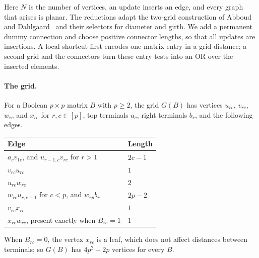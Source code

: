 Here $N$ is the number of vertices, an update inserts an edge, and every graph that arises is planar. The reductions adapt the two-grid construction of Abboud and Dahlgaard~\cite[Definition~1, Corollary~1, and Sections~3 and~6]{abboud_popular_2016} and their selectors for diameter and girth. We add a permanent dummy connection and choose positive connector lengths, so that all updates are insertions. A local shortcut first encodes one matrix entry in a grid distance; a second grid and the connectors turn these entry tests into an OR over the inserted elements.

\paragraph{The grid.}
For a Boolean $p\times p$ matrix $B$ with $p\ge2$, the grid $G(B)$ has vertices $u_{rc}$, $v_{rc}$, $w_{rc}$ and $x_{rc}$ for $r,c\in[p]$, top terminals $a_c$, right terminals $b_r$, and the following edges.
\begin{center}
\begin{tabular}{@{}ll@{}}
\toprule
Edge & Length\\
\midrule
$a_cv_{1c}$, and $u_{r-1,c}v_{rc}$ for $r>1$ & $2c-1$\\
$v_{rc}u_{rc}$ & $1$\\
$u_{rc}w_{rc}$ & $2$\\
$w_{rc}u_{r,c+1}$ for $c<p$, and $w_{rp}b_r$ & $2p-2$\\
$v_{rc}x_{rc}$ & $1$\\
$x_{rc}w_{rc}$, present exactly when $B_{rc}=1$ & $1$\\
\bottomrule
\end{tabular}
\end{center}
When $B_{rc}=0$, the vertex $x_{rc}$ is a leaf, which does not affect distances between terminals; so $G(B)$ has $4p^2+2p$ vertices for every $B$.


